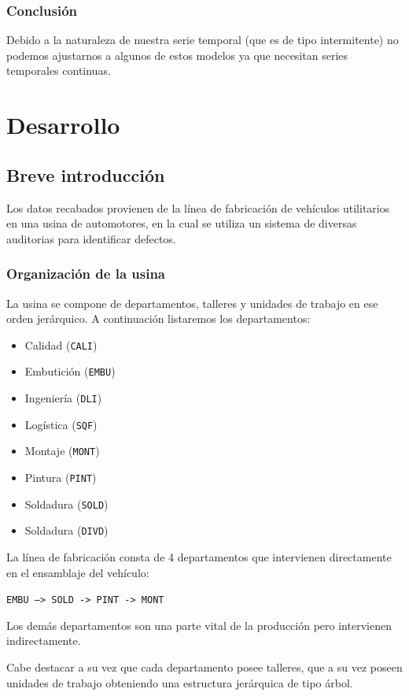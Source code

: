 \documentclass[a4paper,12pt]{article}
\begin{document}
\subsubsection{Conclusión}

Debido a la naturaleza de nuestra serie temporal (que es de tipo intermitente) no podemos ajustarnos a algunos de estos modelos ya que necesitan series temporales continuas.

\section{Desarrollo}

\subsection{Breve introducción}
Los datos recabados provienen de la línea de fabricación de vehículos utilitarios en una usina de automotores, en la cual se utiliza un sistema de diversas auditorias para identificar defectos.

\subsubsection{Organización de la usina}
La usina se compone de departamentos, talleres y unidades de trabajo en ese orden jerárquico. A continuación listaremos los departamentos:

\begin{itemize}
	\item Calidad (\texttt{CALI})
	\item Embutición (\texttt{EMBU})
	\item Ingeniería (\texttt{DLI})
	\item Logística (\texttt{SQF})
	\item Montaje (\texttt{MONT})
	\item Pintura (\texttt{PINT})
	\item Soldadura (\texttt{SOLD})
	\item Soldadura (\texttt{DIVD})
\end{itemize}

La línea de fabricación consta de 4 departamentos que intervienen directamente en el ensamblaje del vehículo:

\texttt{EMBU --> SOLD -> PINT -> MONT}

Los demás departamentos son una parte vital de la producción pero intervienen indirectamente.

Cabe destacar a su vez que cada departamento posee talleres, que a su vez poseen unidades de trabajo obteniendo una estructura jerárquica de tipo árbol.
\end{document}
